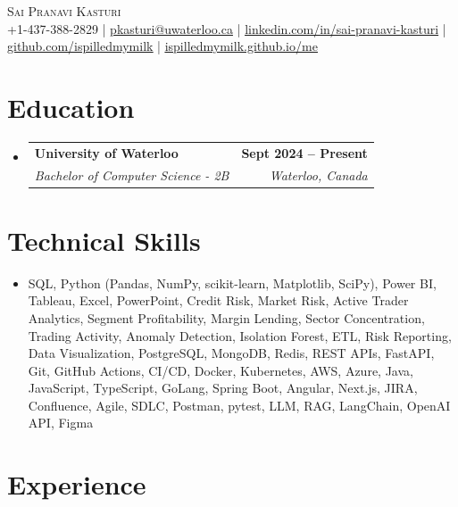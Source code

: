 \documentclass[letterpaper,10pt]{article}
\makeatletter
\newcommand{\resumeSubheading}[4]{
  \vspace{-1pt}\item
    \begin{tabular*}{1.0\textwidth}[t]{l@{\extracolsep{\fill}}r}
      \textbf{#1} & \textbf{\small #2} \\
      \textit{\small#3} & \textit{\small #4} \\[-2pt]
    \end{tabular*}\vspace{-7pt}
}
\newcommand{\resumeSubHeadingListStart}{\begin{itemize}[leftmargin=0.0in, label={}]}
\newcommand{\resumeSubHeadingListEnd}{\end{itemize}}
\makeatother
\begin{document}

\vspace{-28pt}
\begin{center}
    {\Huge \scshape Sai Pranavi Kasturi} \\ 
    
    \small +1-437-388-2829 | \underline{pkasturi@uwaterloo.ca} | \href{https://linkedin.com/in/sai-pranavi-kasturi-704807298}{\underline{linkedin.com/in/sai-pranavi-kasturi}} | \href{https://github.com/ispilledmymilk}{\underline{github.com/ispilledmymilk}} | \href{https://ispilledmymilk.github.io/me/}{\underline{ispilledmymilk.github.io/me}}
    \vspace{-10pt}
\end{center}

\vspace{-10pt}
\section{Education}
  \resumeSubHeadingListStart
    \resumeSubheading
      {University of Waterloo}{Sept 2024 -- Present}
      {Bachelor of Computer Science - 2B}{Waterloo, Canada}
  \resumeSubHeadingListEnd
\vspace{-8pt}


\section{Technical Skills}
\begin{itemize}[leftmargin=0.05in, label={}]
  \small\item{
    SQL, Python (Pandas, NumPy, scikit-learn, Matplotlib, SciPy), Power BI, Tableau, Excel, PowerPoint, Credit Risk, Market Risk, Active Trader Analytics, Segment Profitability, Margin Lending, Sector Concentration, Trading Activity, Anomaly Detection, Isolation Forest, ETL, Risk Reporting, Data Visualization, PostgreSQL, MongoDB, Redis, REST APIs, FastAPI, Git, GitHub Actions, CI/CD, Docker, Kubernetes, AWS, Azure, Java, JavaScript, TypeScript, GoLang, Spring Boot, Angular, Next.js, JIRA, Confluence, Agile, SDLC, Postman, pytest, LLM, RAG, LangChain, OpenAI API, Figma
  }
\end{itemize}
\vspace{-18pt}

\vspace{1.20pt}
\section{Experience}
\end{document}
